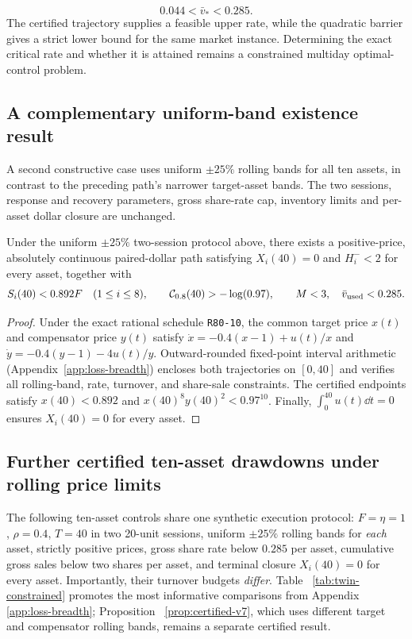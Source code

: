 \documentclass[review,hidelinks,onefignum,onetabnum]{siamonline250211}
\begin{document}
\begin{equation}\label{eq:v7-rate-bracket}
\qquad 0.044<\bar v_*<0.285.\qquad
\end{equation}
The certified trajectory supplies a feasible upper rate, while the quadratic barrier gives a strict lower bound for the same market instance. Determining the exact critical rate and whether it is attained remains a constrained multiday optimal-control problem.
\subsection{A complementary uniform-band existence result}
\label{subsec:loss-breadth}
A second constructive case uses uniform $\pm25\%$ rolling bands
for all ten assets, in contrast to the preceding path's narrower
target-asset bands. The two sessions, response and recovery parameters,
gross share-rate cap, inventory limits and per-asset dollar closure
are unchanged.

\begin{proposition}
\label{prop:loss-breadth-eight}
Under the uniform $\pm25\%$ two-session protocol above, there exists
a positive-price, absolutely continuous paired-dollar path satisfying
$X_i(40)=0$ and $H_i^-<2$ for every asset, together with
\[
S_i(40)<0.892F\quad(1\le i\le8),\qquad
\mathcal{C}_{0.8}(40)>-\log(0.97),\qquad
M<3,\quad\bar v_{\rm used}<0.285.
\]
\end{proposition}
\begin{proof}
Under the exact rational schedule \texttt{R80-10}, the common
target price $x(t)$ and compensator price $y(t)$ satisfy
$\dot x=-0.4(x-1)+u(t)/x$ and
$\dot y=-0.4(y-1)-4u(t)/y$.
Outward-rounded fixed-point interval arithmetic
(Appendix~\ref{app:loss-breadth}) encloses both trajectories
on $[0,40]$ and verifies all rolling-band, rate, turnover,
and share-sale constraints. The certified endpoints satisfy
$x(40)<0.892$ and $x(40)^8y(40)^2<0.97^{10}$.
Finally, $\int_0^{40}u(t)\dd t=0$ ensures
$X_i(40)=0$ for every asset.
\end{proof}

\subsection{Further certified ten-asset drawdowns under rolling price limits}
\label{subsec:twin-constrained}
The following ten-asset controls share one synthetic
execution protocol: $F=\eta=1$, $\rho=0.4$,
$T=40$ in two 20-unit sessions, uniform
$\pm25\%$ rolling bands for \emph{each} asset,
strictly positive prices, gross share rate
below $0.285$ per asset, cumulative gross sales
below two shares per asset, and terminal closure
$X_i(40)=0$ for every asset. Importantly, their
turnover budgets \emph{differ}. Table~
\ref{tab:twin-constrained} promotes the most
informative comparisons from Appendix~
\ref{app:loss-breadth}; Proposition~
\ref{prop:certified-v7}, which uses different
target and compensator rolling bands, remains
a separate certified result.
\end{document}
